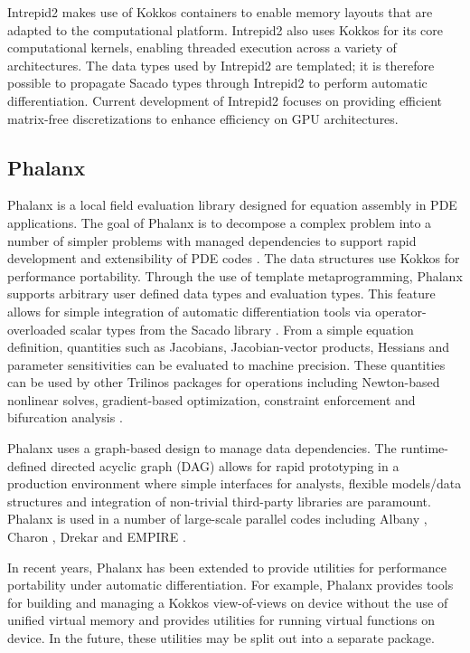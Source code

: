 Intrepid2 makes use of Kokkos containers to enable memory layouts that are adapted to the computational platform. Intrepid2 also uses Kokkos for its core computational kernels, enabling threaded execution across a variety of architectures. The data types used by Intrepid2 are templated; it is therefore possible to propagate Sacado types through Intrepid2 to perform automatic differentiation. Current development of Intrepid2 focuses on providing efficient matrix-free discretizations to enhance efficiency on GPU architectures. 

\subsection{Phalanx}
Phalanx is a local field evaluation library designed for equation assembly in PDE applications. The goal of Phalanx is to decompose a complex problem into a number of simpler problems with managed dependencies to support rapid development and extensibility of PDE codes \cite{Notz2012,pawlowski2012automating,pawlowski2012automatingpart2}. The data structures use Kokkos \cite{trott2021kokkos} for performance portability. Through the use of template metaprogramming, Phalanx supports arbitrary user defined data types and evaluation types. This feature allows for simple integration of automatic differentiation tools via operator-overloaded scalar types from the Sacado library \cite{phipps2022automatic}. From a simple equation definition, quantities such as Jacobians, Jacobian-vector products, Hessians and parameter sensitivities can be evaluated to machine precision. These quantities can be used by other Trilinos packages for operations including Newton-based nonlinear solves, gradient-based optimization, constraint enforcement and bifurcation analysis \cite{pawlowski2012automating,pawlowski2012automatingpart2}.

Phalanx uses a graph-based design to manage data dependencies. The runtime-defined directed acyclic graph (DAG) allows for rapid prototyping in a production environment where simple interfaces for analysts, flexible models/data structures and integration of non-trivial third-party libraries are paramount. Phalanx is used in a number of large-scale parallel codes including Albany \cite{Salinger2016}, Charon \cite{CharonUsersManual2020}, Drekar \cite{Crockatt2022,Miller2019,Shadid2016mhd} and EMPIRE \cite{BettencourtBrownEtAl2021_EmpirePic}.

In recent years, Phalanx has been extended to provide utilities for performance portability under automatic differentiation. For example, Phalanx provides tools for building and managing a Kokkos view-of-views on device without the use of unified virtual memory and provides utilities for running virtual functions on device. In the future, these utilities may be split out into a separate package.

